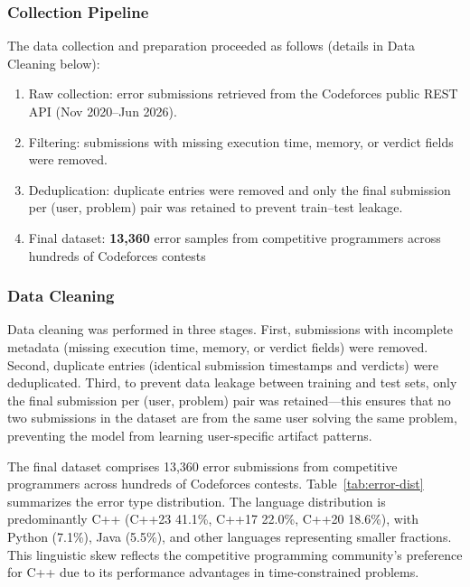 \documentclass[acmsmall]{acmart}
\begin{document}
\subsubsection*{Collection Pipeline}
The data collection and preparation proceeded as follows (details in
Data Cleaning below):
\begin{enumerate}
    \item Raw collection: error submissions retrieved from the
          Codeforces public REST API (Nov 2020--Jun 2026).
    \item Filtering: submissions with missing execution time, memory, or
          verdict fields were removed.
    \item Deduplication: duplicate entries were removed and only the final
          submission per (user, problem) pair was retained to prevent
          train--test leakage.
    \item Final dataset: \textbf{13,360} error samples from competitive
          programmers across hundreds of Codeforces contests
\end{enumerate}

\subsubsection*{Data Cleaning}
Data cleaning was performed in three stages. First, submissions with
incomplete metadata (missing execution time, memory, or verdict fields) were
removed. Second, duplicate entries (identical submission timestamps and
verdicts) were deduplicated. Third, to prevent data leakage between training
and test sets, only the final submission per (user, problem) pair was
retained---this ensures that no two submissions in the dataset are from the
same user solving the same problem, preventing the model from learning
user-specific artifact patterns.

The final dataset comprises 13,360 error submissions from competitive programmers
across hundreds of Codeforces contests. Table~\ref{tab:error-dist} summarizes
the error type distribution. The language distribution
is predominantly C++ (C++23 41.1\%, C++17 22.0\%, C++20 18.6\%), with
Python (7.1\%), Java (5.5\%), and other languages representing smaller
fractions. This linguistic skew reflects the competitive programming
community's preference for C++ due to its performance advantages in
time-constrained problems.
\end{document}
